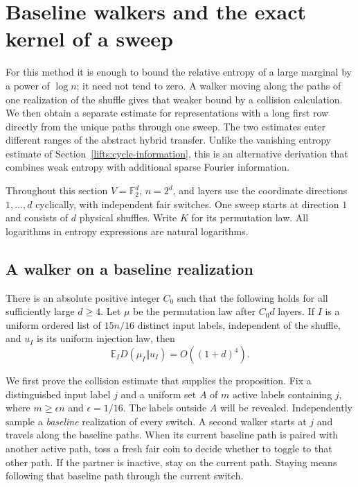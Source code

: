\section{Baseline walkers and the exact kernel of a sweep}
\label{sec:c-baseline-forest}

For this method it is enough to bound the relative entropy of a large
marginal by a power of $\log n$; it need not tend to zero.  A walker
moving along the paths of one realization of the shuffle gives that
weaker bound by a collision calculation.  We then obtain a separate
estimate for representations with a long first row directly from the
unique paths through one sweep.  The two estimates enter different
ranges of the abstract hybrid transfer. Unlike the vanishing entropy
estimate of Section~\ref{lifts:cycle-information}, this is an alternative
derivation that combines weak entropy with additional sparse Fourier
information.

Throughout this section $V=\mathbb F_2^d$, $n=2^d$, and layers use the
coordinate directions $1,\ldots,d$ cyclically, with independent fair
switches.  One sweep starts at direction $1$ and consists of $d$
physical shuffles.  Write $K$ for its permutation law.  All logarithms
in entropy expressions are natural logarithms.

\subsection{A walker on a baseline realization}

\begin{proposition}
\label{prop:c-baseline-entropy}
There is an absolute positive integer $C_0$ such that the following
holds for all sufficiently large $d\ge4$.  Let $\mu$ be the permutation
law after $C_0d$ layers.  If $I$
is a uniform ordered list of $15n/16$ distinct input labels, independent
of the shuffle, and $u_I$ is its uniform injection law, then
\[
 \mathbb E_I D(\mu_I\Vert u_I)=O((1+d)^4).
\]
\end{proposition}

We first prove the collision estimate that supplies the proposition.
Fix a distinguished input label $j$ and a uniform set $A$ of $m$ active
labels containing $j$, where $m\ge\epsilon n$ and $\epsilon=1/16$.
The labels outside $A$ will be revealed.  Independently sample a
\emph{baseline} realization of every switch.  A second walker starts
at $j$ and travels along the baseline paths.  When its current baseline
path is paired with another active path, toss a fresh fair coin to
decide whether to toggle to that other path.  If the partner is
inactive, stay on the current path.  Staying means following that
baseline path through the current switch.

